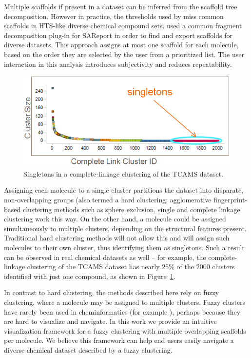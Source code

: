 \documentclass[journal=jacsat,manuscript=article]{achemso}
\newcommand*\fref[1]{Figure~\ref{fig:#1}}
\begin{document}
Multiple scaffolds if present in a dataset can be inferred from the
scaffold tree decomposition\cite{ClarkLabute2008SAReport}. However in
practice, the thresholds used by \citet{ClarkLabute2008SAReport}
miss common scaffolds in HTS-like diverse chemical compound
sets. \citet{Bandyopadhyay2012ACS} used a common fragment
decomposition plug-in for SAReport in order to find and export
scaffolds for diverse datasets.  This approach assigns at most one scaffold for
each molecule, based on the order they are selected by the user from a
prioritized list.  The user interaction in this analysis introduces subjectivity and
reduces repeatability.

\begin{figure}
\includegraphics[width=5.5in]{fig/singletons.png}
\caption{Singletons in a complete-linkage clustering of the TCAMS dataset.}
\label{fig:platypus}
\end{figure}

Assigning each molecule to a single cluster partitions the dataset into
disparate, non-overlapping groups (also termed a hard clustering;
agglomerative fingerprint-based clustering methods such as sphere exclusion, single and complete linkage clustering\cite{Downs2003} work this way. On the other hand, a molecule could be assigned simultaneously to multiple clusters, depending on the structural features present. Traditional
hard clustering methods will not allow this and will assign such molecules
to their own cluster, thus identifying them
as singletons.  Such a result can be observed in real chemical datasets
as well -- for example, the complete-linkage clustering of the TCAMS
dataset\cite{Gamo2010,Calderon2011} has nearly 25\% of the 2000
clusters identified with just one compound, as shown in \fref{platypus}.

In contrast to hard clustering, the methods described
here rely on fuzzy clustering, where a molecule may be assigned to
multiple clusters. Fuzzy clusters have rarely been used in
cheminformatics (for example \cite{Holliday2004,Richmond2013Galois}),
perhaps because they are hard to visualize and navigate.  In this work
we provide an intuitive visualization framework for a fuzzy clustering with
multiple overlapping scaffolds per molecule. We believe this framework can help end
users easily navigate a diverse chemical dataset described by a fuzzy clustering.
\end{document}
